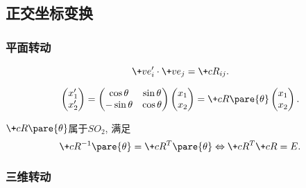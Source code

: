 \documentclass{ctexart}
\begin{document}


\subsection{正交坐标变换} %
\label{sub:正交坐标变换}

\subsubsection{平面转动} %
\label{ssub:平面转动}

\begin{figure}[ht]
    \centering
\end{figure}
\begin{lemma}
    \[ \+ve'_i\cdot\+ve_j = \+cR_{ij}. \]
\end{lemma}
\begin{finale}
\begin{lemma}[旋转变换的矩阵表述]
    \[ \begin{pmatrix}
        x'_1 \\
        x'_2
    \end{pmatrix} = \begin{pmatrix}
        \cos\theta & \sin\theta \\
        -\sin\theta & \cos\theta
    \end{pmatrix}\begin{pmatrix}
        x_1\\
        x_2
    \end{pmatrix} = \+cR\pare{\theta}\begin{pmatrix}
        x_1\\
        x_2
    \end{pmatrix}. \]
\end{lemma}
\end{finale}
\begin{lemma}
    $\+cR\pare{\theta}$属于$SO_2$, 满足
    \[ \+cR^{-1}\pare{\theta} = \+cR^T\pare{\theta} \Leftrightarrow \+cR^T\+cR = E. \]
\end{lemma}


\subsubsection{三维转动} %
\label{ssub:三维转动}
\end{document}

